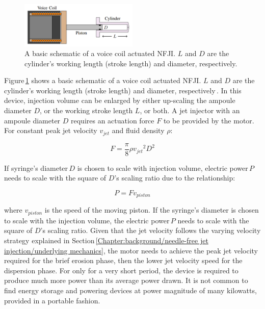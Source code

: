     
    \begin{figure}[!ht]
      \centering
      \includegraphics[width=0.5\textwidth]{chap2/images/vcm_for_nfji.png}
      \caption{A basic schematic of a voice coil actuated \acs{NFJI}. $L$ and $D$ are the cylinder’s working length (stroke length) and diameter, respectively.}
      \label{fig:chapter/background/vcm for nfji}
    \end{figure}
    
    
    Figure\,\ref{fig:chapter/background/vcm for nfji} shows a basic schematic of a voice coil actuated \acs{NFJI}. $L$ and $D$ are the cylinder’s working length (stroke length) and diameter, respectively\,\cite{ruddy2014}. In this device, injection volume can be enlarged by either up-scaling the ampoule diameter $D$, or the working stroke length $L$, or both. A jet injector with an ampoule diameter $D$ requires an actuation force $F$ to be provided by the motor. For constant peak jet velocity $v_{jet}$ and fluid density $\rho$:
    
    
    \begin{equation}
        F=\frac{\pi}{8}\rho {v_{jet}}^2 D^2
        \label{eq:force produce relationship in motor powered NFJI}
    \end{equation}
    
    
    If syringe’s diameter\,$D$ is chosen to scale with injection volume, electric power\,$P$ needs to scale with the square of $D$’s scaling ratio due to the relationship:
    
    
    \begin{equation}
        P=F v_{piston}
        \label{eq:power required for F and v_piston}
    \end{equation}
    
    
    where $v_{piston}$ is the speed of the moving piston. If the syringe’s diameter  is chosen to scale with the injection volume, the electric power\,$P$ needs to scale with the square of $D$’s scaling ratio. Given that the jet velocity follows the varying velocity strategy explained in Section\,\ref{Chapter:background/needle-free jet injection/underlying mechanics}, the motor needs to achieve the peak jet velocity required for the brief erosion phase, then the lower jet velocity speed for the dispersion phase. For only for a very short period, the device is required to produce much more power than its average power drawn. It is not common to find energy storage and powering devices at power magnitude of many kilowatts, provided in a portable fashion.
    

